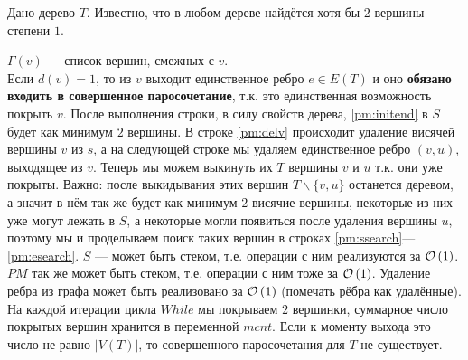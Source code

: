 Дано дерево $T$. Известно, что в любом дереве найдётся хотя бы $2$ вершины степени $1$. 
\begin{algorithmic}[1]
	\EndIf
\EndFor \label{pm:initend}
	 \label{pm:delv}
	 \label{pm:ssearch}
		\EndIf
	\EndFor					\label{pm:esearch}
\EndWhile
{}
\EndIf
{}
\end{algorithmic}
$\Gamma(v)$ --- список вершин, смежных с $v$.\\
Если $d(v) = 1$, то из $v$ выходит единственное ребро $e \in E(T)$ и оно \textbf{обязано входить в совершенное 
паросочетание},
т.к. это единственная возможность покрыть $v$. После выполнения строки, в силу свойств дерева, \ref{pm:initend} в $S$ 
будет как минимум $2$ вершины. В строке \ref{pm:delv} происходит удаление висячей вершины $v$ из $s$, а на следующей 
строке мы удаляем единственное ребро $(v, u)$, выходящее из $v$. Теперь мы можем выкинуть их $T$ вершины $v$ и $u$ т.к.
они уже покрыты. Важно: после выкидывания этих вершин $T\backslash\lbrace v,u \rbrace$ останется деревом, а значит в нём
так же будет как минимум $2$ висячие вершины, некоторые из них уже могут лежать в $S$, а некоторые могли появиться после
удаления вершины $u$, поэтому мы и проделываем поиск таких вершин в строках \ref{pm:ssearch}---\ref{pm:esearch}.
$S$ --- может быть стеком, т.е. операции с ним реализуются за $\mathcal{O}\left(1\right)$. $PM$ так же может быть стеком, т.е. операции
с ним тоже за $\mathcal{O}\left(1\right)$. Удаление ребра из графа может быть реализовано за $\mathcal{O}\left(1\right)$ (помечать рёбра как удалённые).
На каждой итерации цикла $While$ мы покрываем $2$ вершинки, суммарное число покрытых вершин хранится в переменной $mcnt$.
Если к моменту выхода это число не равно $|V(T)|$, то совершенного паросочетания для $T$ не существует.


